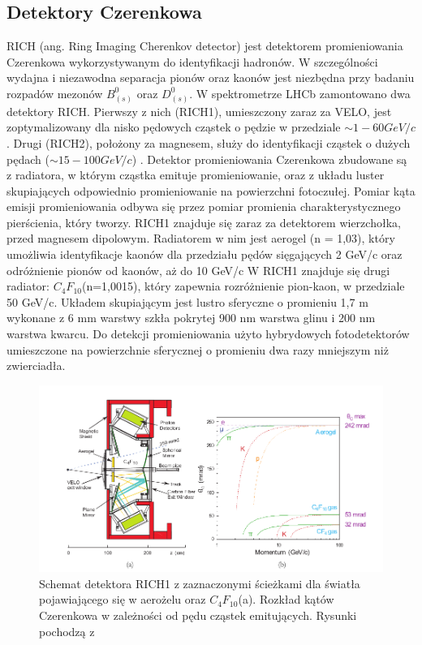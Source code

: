\subsection{Detektory Czerenkowa}
RICH (ang. Ring Imaging Cherenkov detector) jest detektorem promieniowania Czerenkowa wykorzystywanym do identyfikacji hadronów. W szczególności wydajna i niezawodna separacja pionów oraz kaonów jest niezbędna przy badaniu rozpadów mezonów $B_{(s)}^0$ oraz $D_{(s)}^0$. W spektrometrze LHCb zamontowano dwa detektory RICH. Pierwszy z nich (RICH1), umieszczony zaraz za VELO, jest zoptymalizowany dla nisko pędowych cząstek o pędzie w przedziale $\sim 1- 60 GeV/c$. Drugi (RICH2), położony za magnesem, służy do identyfikacji cząstek o dużych pędach ($\sim 15-100 GeV/c$) \cite{RICH}. Detektor promieniowania Czerenkowa zbudowane są z radiatora, w którym cząstka emituje promieniowanie, oraz z układu luster skupiających odpowiednio promieniowanie na powierzchni fotoczułej. Pomiar kąta emisji promieniowania odbywa się przez pomiar promienia charakterystycznego pierścienia, który tworzy.
RICH1 znajduje się zaraz za detektorem wierzchołka, przed magnesem dipolowym. Radiatorem w nim jest aerogel (n = 1,03), który umożliwia identyfikacje kaonów dla przedziału pędów sięgających 2 GeV/c oraz odróżnienie pionów od kaonów, aż do 10 GeV/c  W RICH1 znajduje się drugi radiator:  $C_4F_{10}$(n=1,0015), który zapewnia rozróżnienie pion-kaon, w przedziale  50 GeV/c. Układem skupiającym jest lustro sferyczne o promieniu 1,7 m wykonane z
6 mm warstwy szkła pokrytej 900 nm warstwa glinu i 200 nm warstwa kwarcu. Do detekcji promieniowania użyto hybrydowych fotodetektorów umieszczone na powierzchnie sferycznej o promieniu dwa razy mniejszym niż zwierciadła.



\begin{figure}[th]
  \centering
  \includegraphics[scale=0.5]{rozdzial2/RICH.png}
  \caption{Schemat detektora RICH1	z zaznaczonymi ścieżkami dla światła pojawiającego się w aerożelu oraz $C_4F_{10}$(a). Rozkład kątów Czerenkowa w zależności od pędu cząstek emitujących. Rysunki pochodzą z  \cite{public}}
  \label{fig:RICH}
\end{figure}


